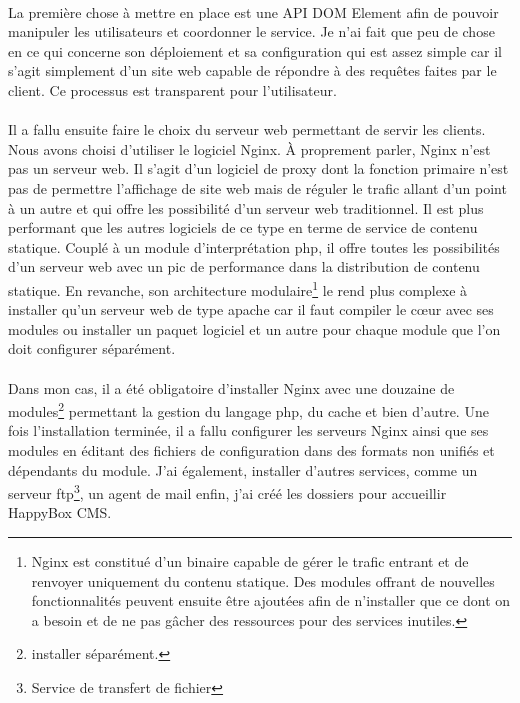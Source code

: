 \documentclass[11pt, a4paper ]{article}
\begin{document}
\begin{spacing}{1.5}
\paragraph{}
La première chose à mettre en place est une API DOM Element afin de pouvoir manipuler les utilisateurs et coordonner le service. Je n'ai fait que peu de chose en ce qui concerne son déploiement et sa configuration qui est assez simple car il s'agit simplement d'un site web capable de répondre à des requêtes faites par le client. Ce processus est transparent pour l'utilisateur.
\paragraph{}
Il a fallu ensuite faire le choix du serveur web permettant de servir les clients. Nous avons choisi d'utiliser le logiciel Nginx. À proprement parler, Nginx n'est pas un serveur web. Il s'agit d'un logiciel de proxy dont la fonction primaire n'est pas de permettre l'affichage de site web mais de réguler le trafic allant d'un point à un autre et qui offre les possibilité d'un serveur web traditionnel. Il est plus performant que les autres logiciels de ce type en terme de service de contenu statique. Couplé à un module d’interprétation php, il offre toutes les possibilités d'un serveur web avec un pic de performance dans la distribution de contenu statique. En revanche, son architecture modulaire\footnote{Nginx est constitué d'un binaire capable de gérer le trafic entrant et de renvoyer uniquement du contenu statique. Des modules offrant de nouvelles fonctionnalités peuvent ensuite être ajoutées afin de n'installer que ce dont on a besoin et de ne pas gâcher des ressources pour des services inutiles.} le rend plus complexe à installer qu'un serveur web de type apache car il faut compiler le cœur avec ses modules ou installer un paquet logiciel et un autre pour chaque module que l'on doit configurer séparément.
\paragraph{}
Dans mon cas, il a été obligatoire d'installer Nginx avec une douzaine de modules\footnote{installer séparément.} permettant la gestion du langage php, du cache et bien d'autre. Une fois l'installation terminée, il a fallu configurer les serveurs Nginx ainsi que ses modules en éditant des fichiers de configuration dans des formats non unifiés et dépendants du module. J'ai également, installer d'autres services, comme un serveur ftp\footnote{Service de transfert de fichier}, un agent de mail enfin, j'ai créé les dossiers pour accueillir HappyBox CMS.

\end{spacing}
\end{document}
